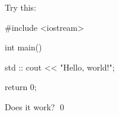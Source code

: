 Try this:
\begin{console}
#include <iostream>

int main()
{
    std    ::    cout << "Hello, world!\n";

    return 0;
}
\end{console}
Does it work?
\qed
